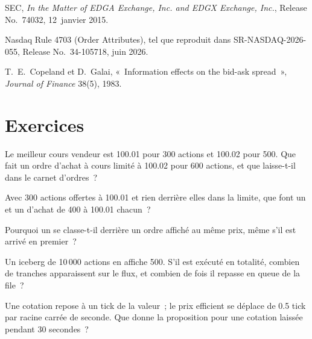 \begin{omsources}
\item SEC, \emph{In the Matter of EDGA Exchange, Inc. and EDGX Exchange, Inc.}, Release No.~74032, 12~janvier 2015.
\item Nasdaq Rule 4703 (Order Attributes), tel que reproduit dans SR-NASDAQ-2026-055, Release No.~34-105718, juin 2026.
\item T.~E.~Copeland et D.~Galai, «~Information effects on the bid-ask spread~», \emph{Journal of Finance} 38(5), 1983.
\end{omsources}

\section{Exercices}

\begin{exercise}[$\star$]\label{exo:mx:order-types-and-their-uses:1}
Le meilleur cours vendeur est 100.01 pour 300 actions et 100.02 pour 500. Que fait un ordre d'achat à cours limité à 100.02 pour 600 actions, et que laisse-t-il dans le carnet d'ordres~?
\end{exercise}

\begin{exercise}[$\star$]\label{exo:mx:order-types-and-their-uses:2}
Avec 300 actions offertes à 100.01 et rien derrière elles dans la limite, que font un  et un  d'achat de 400 à 100.01 chacun~?
\end{exercise}

\begin{exercise}[$\star$]\label{exo:mx:order-types-and-their-uses:3}
Pourquoi un  se classe-t-il derrière un ordre affiché au même prix, même s'il est arrivé en premier~?
\end{exercise}

\begin{exercise}[$\star\star$]\label{exo:mx:order-types-and-their-uses:4}
Un iceberg de 10\,000 actions en affiche 500. S'il est exécuté en totalité, combien de tranches apparaissent sur le flux, et combien de fois il repasse en
queue de la file~?
\end{exercise}

\begin{exercise}[$\star\star$]\label{exo:mx:order-types-and-their-uses:5}
Une cotation repose à un tick de la valeur~; le prix efficient se déplace de 0.5 tick par racine carrée de seconde. Que donne la proposition pour une cotation laissée
pendant 30 secondes~?
\end{exercise}

